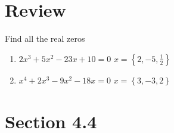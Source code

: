 \documentclass{exam}
\begin{document}
    \section{Review}

    Find all the real zeros
    \begin{enumerate}
      \item $2x^3 + 5x^2 - 23x + 10 = 0$
        \ifprintanswers
          $x = \left\{ 2, -5, \frac{1}{2} \right\}$
        \fi

      \item $x^4 + 2x^3 - 9x^2 - 18x = 0$
        \ifprintanswers
          $x = \left\{ 3, -3, 2 \right\}$
        \fi
    \end{enumerate}

  \ifprintanswers
    \section{Section 4.4}
\end{document}
